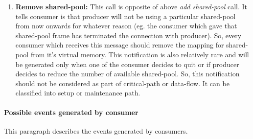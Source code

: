 \documentclass[a4paper,twoside]{report} %
\begin{document}
\begin{enumerate}
 \item \textbf{Remove shared-pool:}  This call is opposite of above
 \textit{add shared-pool} call.  It tells consumer is that producer
 will not be using a particular shared-pool from now onwards
 for whatever reason (eg. the consumer which gave that shared-pool
 frame has terminated the connection with producer).  So, every
 consumer which receives this message should remove the mapping for
 shared-pool from it's virtual memory.  This notification is
 also relatively rare and will be generated only when one of the
 consumer decides to quit or if producer decides to reduce the number
 of available shared-pool.  So, this notification should not
 be considered as part of critical-path or data-flow.  It can be
 classified into setup or maintenance path.
\end{enumerate} 

\paragraph{Possible events generated by consumer}
This paragraph describes the events generated by consumers.
\end{document}
